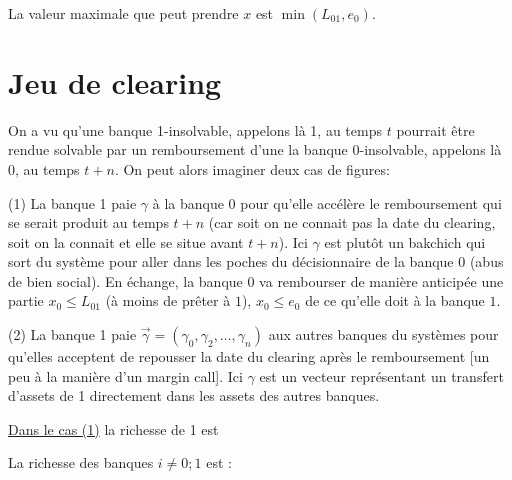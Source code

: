 \documentclass[11pt,oneside,twocolumn]{article}
\begin{document}
La valeur maximale que peut prendre $x$
est $\min(L_{01},e_0)$.

\section{Jeu de clearing}
On a vu qu'une banque 1-insolvable, appelons là 1, au temps $t$ pourrait être rendue solvable par un remboursement d'une la banque 0-insolvable, appelons là 0, au temps $t+n$. On peut alors imaginer deux cas de figures:

(1) La banque 1 paie $\gamma$ à la banque 0 pour qu'elle accélère le remboursement qui se serait produit au temps $t+n$ (car soit on ne connait pas la date du clearing, soit on la connait et elle se situe avant $t+n$). Ici $\gamma$ est plutôt un bakchich qui sort du système pour aller dans les poches du décisionnaire de la banque $0$ (abus de bien social). En échange, la banque $0$ va rembourser de manière anticipée une partie $x_0\leq L_{01}$ (à moins de prêter à $1$),
$x_0\leq e_0$ de ce qu'elle doit à la banque $1$.


(2) La banque 1 paie $\vec \gamma = (\gamma_0, \gamma_2, \ldots, \gamma_n)$ aux autres banques du systèmes pour qu'elles acceptent de repousser la date du clearing après le remboursement [un peu à la manière d'un margin call]. Ici $\gamma$ est un vecteur représentant un transfert d'assets de 1 directement dans les assets des autres banques.



\underline{Dans le cas (1)} la richesse de 1 est


La richesse des banques $i\neq 0; 1$ est :

\end{document}
